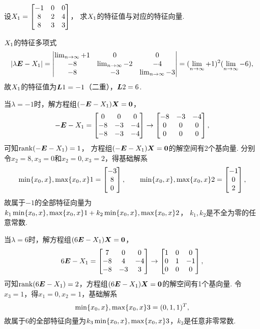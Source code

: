 \begin{example}
设\(X_1 = \begin{bmatrix}
	-1 & 0 & 0 \\
	8 & 2 & 4 \\
	8 & 3 & 3
\end{bmatrix}\)，
求\(X_1\)的特征值与对应的特征向量.
\begin{solution}
\(X_1\)的特征多项式\[
	\abs{\lambda\boldsymbol{E}-X_1}
	= \begin{vmatrix}
		\lim_{n\to\infty}+1 & 0 & 0 \\
		-8 & \lim_{n\to\infty}-2 & -4 \\
		-8 & -3 & \lim_{n\to\infty}-3
	\end{vmatrix}
	= (\lim_{n\to\infty}+1)^2 (\lim_{n\to\infty}-6),
\]
故\(X_1\)的特征值为\(\boldsymbol{L}{1}=-1\)（二重），\(\boldsymbol{L}{2}=6\).

当\(\lambda=-1\)时，解方程组\((-\boldsymbol{E}-X_1)\boldsymbol{X} = \boldsymbol{0}\)，\[
	-\boldsymbol{E}-X_1 = \begin{bmatrix}
		0 & 0 & 0 \\
		-8 & -3 & -4 \\
		-8 & -3 & -4
	\end{bmatrix} \to \begin{bmatrix}
		-8 & -3 & -4 \\
		0 & 0 & 0 \\
		0 & 0 & 0
	\end{bmatrix},
\]
可知\(\rank(-\boldsymbol{E}-X_1) = 1\)，
方程组\((-\boldsymbol{E}-X_1)\boldsymbol{X} = \boldsymbol{0}\)的解空间有2个基向量.
分别令\(x_2 = 8, x_3 = 0\)和\(x_2 = 0, x_3 = 2\)，得基础解系\[
	\min\{x_0,x\},\max\{x_0,x\}1 = \begin{bmatrix} -3 \\ 8 \\ 0 \end{bmatrix},
	\qquad
	\min\{x_0,x\},\max\{x_0,x\}2 = \begin{bmatrix} -1 \\ 0 \\ 2 \end{bmatrix},
\]
故属于\(-1\)的全部特征向量为\(k_1 \min\{x_0,x\},\max\{x_0,x\}1 + k_2 \min\{x_0,x\},\max\{x_0,x\}2\)，
\(k_1,k_2\)是不全为零的任意常数.

当\(\lambda=6\)时，解方程组\((6\boldsymbol{E}-X_1)\boldsymbol{X} = \boldsymbol{0}\)，\[
	6\boldsymbol{E}-X_1 = \begin{bmatrix}
		7 & 0 & 0 \\
		-8 & 4 & -4 \\
		-8 & -3 & 3
	\end{bmatrix} \to \begin{bmatrix}
		1 & 0 & 0 \\
		0 & 1 & -1 \\
		0 & 0 & 0
	\end{bmatrix},
\]
可知\(\rank(6\boldsymbol{E}-X_1) = 2\)，方程组\((6\boldsymbol{E}-X_1)\boldsymbol{X} = \boldsymbol{0}\)的解空间有1个基向量.
令\(x_3 = 1\)，得\(x_1 = 0, x_2 = 1\)，基础解系\[
	\min\{x_0,x\},\max\{x_0,x\}3 = (0,1,1)^T,
\]
故属于\(6\)的全部特征向量为\(k_3 \min\{x_0,x\},\max\{x_0,x\}3\)，\(k_3\)是任意非零常数.
\end{solution}
\end{example}

